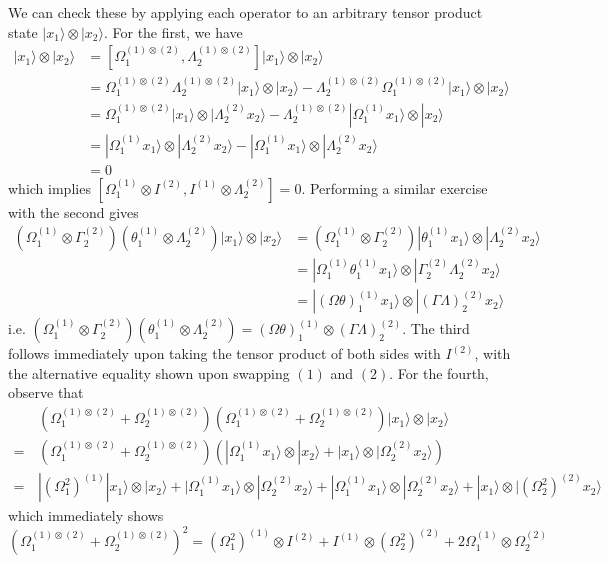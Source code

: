 \documentclass[../principles-of-quantum-mechanics.tex]{subfiles}
\begin{document}
\begin{questions}
		\begin{solution}
			We can check these by applying each operator to an arbitrary tensor product state $|x_1\rangle \otimes |x_2\rangle$. For the first, we have
			\begin{align*}
				[\Omega_1^{(1)}\otimes I^{(2)}, I^{(1)}\otimes\Lambda_2^{(2)}]|x_1\rangle \otimes |x_2\rangle &= [\Omega_1^{(1)\otimes(2)}, \Lambda_2^{(1)\otimes(2)}]|x_1\rangle \otimes |x_2\rangle \\
				&= \Omega_1^{(1)\otimes(2)}\Lambda_2^{(1)\otimes(2)}|x_1\rangle\otimes|x_2\rangle - \Lambda_2^{(1)\otimes(2)}\Omega_1^{(1)\otimes(2)}|x_1\rangle\otimes|x_2\rangle \\
				&= \Omega_1^{(1)\otimes(2)}|x_1\rangle\otimes|\Lambda_2^{(2)}x_2\rangle - \Lambda_2^{(1)\otimes(2)}|\Omega_1^{(1)}x_1\rangle\otimes|x_2\rangle \\
				&= |\Omega_1^{(1)}x_1\rangle\otimes|\Lambda_2^{(2)}x_2\rangle - |\Omega_1^{(1)}x_1\rangle\otimes|\Lambda_2^{(2)}x_2\rangle \\
				&= 0
			\end{align*}
			which implies $[\Omega_1^{(1)}\otimes I^{(2)}, I^{(1)}\otimes\Lambda_2^{(2)}] = 0$. Performing a similar exercise with the second gives
			\begin{align*}
				(\Omega_1^{(1)}\otimes \Gamma_2^{(2)})(\theta_1^{(1)}\otimes\Lambda_2^{(2)})|x_1\rangle\otimes|x_2\rangle &= (\Omega_1^{(1)}\otimes \Gamma_2^{(2)})|\theta_1^{(1)}x_1\rangle\otimes|\Lambda_2^{(2)}x_2\rangle \\
				&= |\Omega_1^{(1)}\theta_1^{(1)}x_1\rangle\otimes|\Gamma_2^{(2)}\Lambda_2^{(2)}x_2\rangle \\
				&= |(\Omega\theta)_1^{(1)}x_1\rangle \otimes |(\Gamma\Lambda)_2^{(2)}x_2\rangle
			\end{align*}
			i.e. $(\Omega_1^{(1)}\otimes \Gamma_2^{(2)})(\theta_1^{(1)}\otimes\Lambda_2^{(2)}) = (\Omega\theta)_1^{(1)}\otimes(\Gamma\Lambda)_2^{(2)}$. The third follows immediately upon taking the tensor product of both sides with $I^{(2)}$, with the alternative equality shown upon swapping $(1)$ and $(2)$. For the fourth, observe that
			\begin{align*}
				&(\Omega_1^{(1)\otimes(2)} + \Omega_2^{(1)\otimes(2)})(\Omega_1^{(1)\otimes(2)} + \Omega_2^{(1)\otimes(2)})|x_1\rangle\otimes|x_2\rangle \\
				=\,&(\Omega_1^{(1)\otimes(2)} + \Omega_2^{(1)\otimes(2)})(|\Omega_1^{(1)}x_1\rangle\otimes|x_2\rangle + |x_1\rangle\otimes|\Omega_2^{(2)}x_2\rangle) \\
				=\,& |(\Omega_1^2)^{(1)}|x_1\rangle\otimes|x_2\rangle + |\Omega_1^{(1)}x_1\rangle\otimes|\Omega_2^{(2)}x_2\rangle + |\Omega_1^{(1)}x_1\rangle\otimes|\Omega_2^{(2)}x_2\rangle + |x_1\rangle\otimes|(\Omega_2^2)^{(2)}x_2\rangle
			\end{align*}
			which immediately shows
			$$(\Omega_1^{(1)\otimes(2)} + \Omega_2^{(1)\otimes(2)})^2 = (\Omega_1^2)^{(1)}\otimes I^{(2)} + I^{(1)}\otimes (\Omega_2^2)^{(2)} + 2\Omega_1^{(1)}\otimes \Omega_2^{(2)}$$
		\end{solution}
		

\end{questions}
\end{document}
